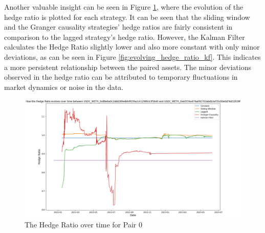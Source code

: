 \noindent Another valuable insight can be seen in Figure \ref{fig:HedgeRatioPerStrat}, where the evolution of the hedge ratio is plotted for each strategy. It can be seen that the sliding window and the Granger causality strategies' hedge ratios are fairly consistent in comparison to the lagged strategy's hedge ratio. However, the Kalman Filter calculates the Hedge Ratio slightly lower and also more constant with only minor deviations, as can be seen in Figure \ref{fig:evolving_hedge_ratio_kf}. This indicates a more persistent relationship between the paired assets. The minor deviations observed in the hedge ratio can be attributed to temporary fluctuations in market dynamics or noise in the data.

\begin{figure}[H]
    \centering
    \includegraphics[width=\linewidth]{evaluation/Images/HedgeRatioPerStrat.png}
    \caption{The Hedge Ratio over time for Pair 0}
    \label{fig:HedgeRatioPerStrat}
\end{figure}

